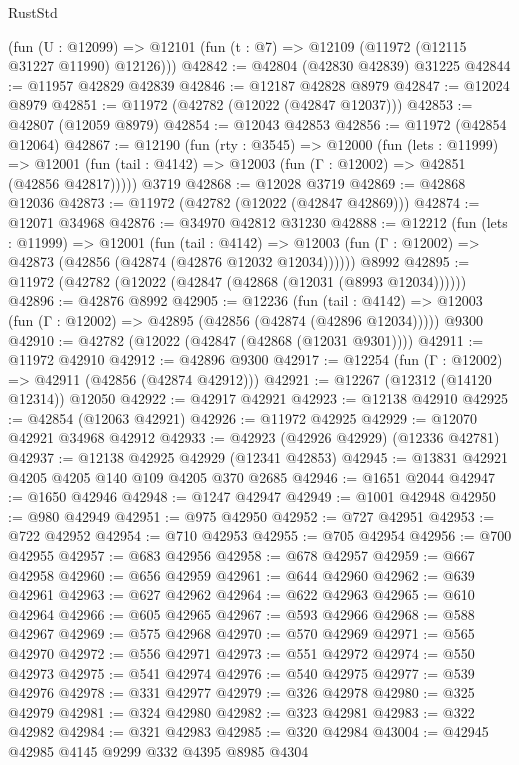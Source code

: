 \begin{lexlean}{RustStd}
\begin{coremodule}
    (fun (U : @12099) => @12101 (fun (t : @7) => @12109 (@11972 (@12115 @31227 @11990) @12126)))
@42842 := @42804 (@42830 @42839) @31225
@42844 := @11957 @42829 @42839
@42846 := @12187 @42828 @8979
@42847 := @12024 @8979
@42851 := @11972 (@42782 (@12022 (@42847 @12037)))
@42853 := @42807 (@12059 @8979)
@42854 := @12043 @42853
@42856 := @11972 (@42854 @12064)
@42867 := @12190
    (fun (rty : @3545) =>
    @12000
      (fun (lets : @11999) =>
      @12001 (fun (tail : @4142) => @12003 (fun (Γ : @12002) => @42851 (@42856 @42817)))))
    @3719
@42868 := @12028 @3719
@42869 := @42868 @12036
@42873 := @11972 (@42782 (@12022 (@42847 @42869)))
@42874 := @12071 @34968
@42876 := @34970 @42812 @31230
@42888 := @12212
    (fun (lets : @11999) =>
    @12001
      (fun (tail : @4142) =>
      @12003 (fun (Γ : @12002) => @42873 (@42856 (@42874 (@42876 @12032 @12034))))))
    @8992
@42895 := @11972 (@42782 (@12022 (@42847 (@42868 (@12031 (@8993 @12034))))))
@42896 := @42876 @8992
@42905 := @12236
    (fun (tail : @4142) => @12003 (fun (Γ : @12002) => @42895 (@42856 (@42874 (@42896 @12034)))))
    @9300
@42910 := @42782 (@12022 (@42847 (@42868 (@12031 @9301))))
@42911 := @11972 @42910
@42912 := @42896 @9300
@42917 := @12254 (fun (Γ : @12002) => @42911 (@42856 (@42874 @42912)))
@42921 := @12267 (@12312 (@14120 @12314)) @12050
@42922 := @42917 @42921
@42923 := @12138 @42910
@42925 := @42854 (@12063 @42921)
@42926 := @11972 @42925
@42929 := @12070 @42921 @34968 @42912
@42933 := @42923 (@42926 @42929) (@12336 @42781)
@42937 := @12138 @42925 @42929 (@12341 @42853)
@42945 := @13831 @42921 @4205 @4205 @140 @109 @4205 @370 @2685
@42946 := @1651 @2044
@42947 := @1650 @42946
@42948 := @1247 @42947
@42949 := @1001 @42948
@42950 := @980 @42949
@42951 := @975 @42950
@42952 := @727 @42951
@42953 := @722 @42952
@42954 := @710 @42953
@42955 := @705 @42954
@42956 := @700 @42955
@42957 := @683 @42956
@42958 := @678 @42957
@42959 := @667 @42958
@42960 := @656 @42959
@42961 := @644 @42960
@42962 := @639 @42961
@42963 := @627 @42962
@42964 := @622 @42963
@42965 := @610 @42964
@42966 := @605 @42965
@42967 := @593 @42966
@42968 := @588 @42967
@42969 := @575 @42968
@42970 := @570 @42969
@42971 := @565 @42970
@42972 := @556 @42971
@42973 := @551 @42972
@42974 := @550 @42973
@42975 := @541 @42974
@42976 := @540 @42975
@42977 := @539 @42976
@42978 := @331 @42977
@42979 := @326 @42978
@42980 := @325 @42979
@42981 := @324 @42980
@42982 := @323 @42981
@42983 := @322 @42982
@42984 := @321 @42983
@42985 := @320 @42984
@43004 := @42945
    @42985
    @4145
    @9299
    @332
    @4395
    @8985
    @4304

\end{coremodule}
\end{lexlean}
